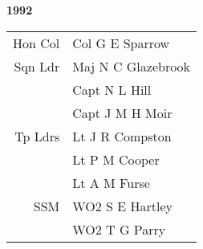 \begin{center}
  \Huge
  \textbf{1992}
\end{center}

\begin{center}
  \small
  \begin{tabular}{rl}
    Hon Col & Col G E Sparrow \\
    Sqn Ldr & Maj N C Glazebrook \\
      & Capt N L Hill \\
      & Capt J M H Moir \\
    Tp Ldrs & Lt J R Compston \\
      & Lt P M Cooper \\
      & Lt A M Furse \\
    SSM & WO2 S E Hartley \\
      & WO2 T G Parry \\
  \end{tabular}
\end{center}

